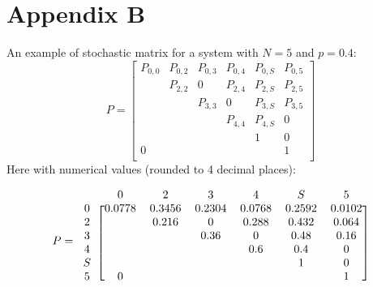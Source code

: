 \section*{Appendix B}
\label{app:b}
An example of stochastic matrix for a system with $N = 5$ and $p = 0.4$:
\begin{equation*}
P = 
\begin{bmatrix}
P_{0,0}	& P_{0,2}	& P_{0,3}  	& P_{0, 4}	& P_{0,S}	& P_{0,5} \\
		& P_{2,2}	& 0  		& P_{2, 4}	& P_{2,S}	& P_{2,5} \\
		& 			& P_{3,3}	& 0			& P_{3,S}	& P_{3,5} \\
		& 			& 			& P_{4,4}	& P_{4,S}	& 0\\
		& 			& 			& 			& 1			& 0\\
0		& 			& 		  	& 			& 			& 1\\
\end{bmatrix}
\label{exampleMatrix}
\end{equation*}
Here with numerical values (rounded to 4 decimal places):


\begin{equation*}
P=
\begin{blockarray}{ccccccc}
 & 0 & 2 & 3 & 4 & S & 5 \\
\begin{block}{c[cccccc]}
0	&	0.0778	& 0.3456	& 0.2304  	& 0.0768	& 0.2592	& 0.0102 \\
2	&			& 0.216		& 0  		&0.288		& 0.432		& 0.064 \\
3	&			& 			& 0.36		& 0			& 0.48		& 0.16 \\
4	&			& 			& 			& 0.6		& 0.4		& 0\\
S	&			& 			& 			& 			& 1			& 0\\
5	&	0		& 			& 		  	& 			& 			& 1\\
\end{block}
\end{blockarray}
\label{exampleMatrixValues}
\end{equation*}
\newpage

